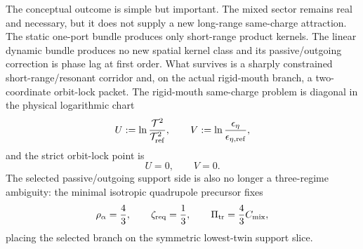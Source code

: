 The conceptual outcome is simple but important.  The mixed sector remains real and necessary, but it does not supply a new long-range same-charge attraction.  The static one-port bundle produces only short-range product kernels.  The linear dynamic bundle produces no new spatial kernel class and its passive/outgoing correction is phase lag at first order.  What survives is a sharply constrained short-range/resonant corridor and, on the actual rigid-mouth branch, a two-coordinate orbit-lock packet.  The rigid-mouth same-charge problem is diagonal in the physical logarithmic chart
\begin{equation}
\label{eq:app-part07-intro-uv-chart}
U:=\ln\frac{\mathcal T^2}{\mathcal T_{\rm ref}^2},
\qquad
V:=\ln\frac{\epsilon_\eta}{\epsilon_{\eta,\rm ref}},
\end{equation}
and the strict orbit-lock point is
\begin{equation}
\label{eq:app-part07-intro-orbit-lock}
U=0,
\qquad
V=0.
\end{equation}
The selected passive/outgoing support side is also no longer a three-regime ambiguity: the minimal isotropic quadrupole precursor fixes
\begin{equation}
\label{eq:app-part07-intro-selected-twin-slice}
\rho_\alpha=\frac43,
\qquad
\zeta_{\rm req}=\frac13,
\qquad
\Pi_{\rm tr}=\frac43 C_{\rm mix},
\end{equation}
placing the selected branch on the symmetric lowest-twin support slice.

